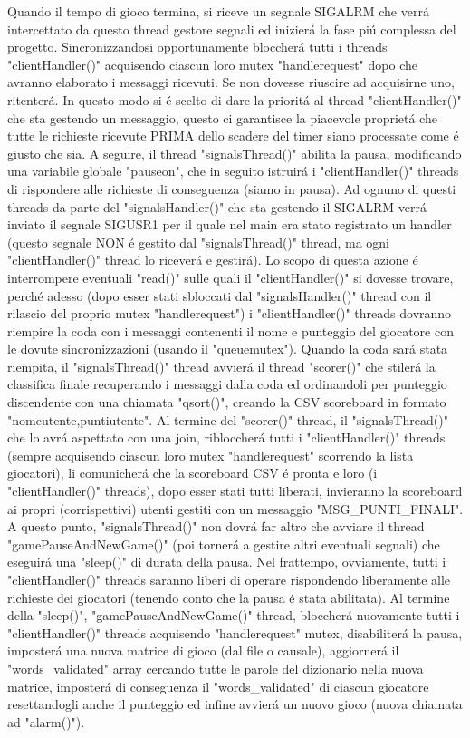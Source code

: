Quando il tempo di gioco termina, si riceve un segnale SIGALRM che verr\'a intercettato da questo thread gestore segnali ed inizier\'a la fase pi\'u complessa del progetto. Sincronizzandosi opportunamente bloccher\'a tutti i threads "clientHandler()" acquisendo ciascun loro mutex "handlerequest" dopo che avranno elaborato i messaggi ricevuti. Se non dovesse riuscire ad acquisirne uno, ritenter\'a. In questo modo si \'e scelto di dare la priorit\'a al thread "clientHandler()" che sta gestendo un messaggio, questo ci garantisce la piacevole propriet\'a che tutte le richieste ricevute PRIMA dello scadere del timer siano processate come \'e giusto che sia. A seguire, il thread "signalsThread()" abilita la pausa, modificando una variabile globale "pauseon", che in seguito istruir\'a i "clientHandler()" threads di rispondere alle richieste di conseguenza (siamo in pausa). Ad ognuno di questi threads da parte del "signalsHandler()" che sta gestendo il SIGALRM verr\'a inviato il segnale SIGUSR1 per il quale nel main era stato registrato un handler (questo segnale NON \'e gestito dal "signalsThread()" thread, ma ogni "clientHandler()" thread lo ricever\'a e gestir\'a). Lo scopo di questa azione \'e interrompere eventuali "read()" sulle quali il "clientHandler()" si dovesse trovare, perch\'e adesso (dopo esser stati sbloccati dal "signalsHandler()" thread con il rilascio del proprio mutex "handlerequest") i "clientHandler()" threads dovranno riempire la coda con i messaggi contenenti il nome e punteggio del giocatore con le dovute sincronizzazioni (usando il "queuemutex"). Quando la coda sar\'a stata riempita, il "signalsThread()" thread avvier\'a il thread "scorer()" che stiler\'a la classifica finale recuperando i messaggi dalla coda ed ordinandoli per punteggio discendente con una chiamata "qsort()", creando la CSV scoreboard in formato "nomeutente,puntiutente". Al termine del "scorer()" thread, il "signalsThread()" che lo avr\'a aspettato con una join, ribloccher\'a tutti i "clientHandler()" threads (sempre acquisendo ciascun loro mutex "handlerequest" scorrendo la lista giocatori), li comunicher\'a che la scoreboard CSV \'e pronta e loro (i "clientHandler()" threads), dopo esser stati tutti liberati, invieranno la scoreboard ai propri (corrispettivi) utenti gestiti con un messaggio "MSG\_PUNTI\_FINALI". A questo punto, "signalsThread()" non dovr\'a far altro che avviare il thread "gamePauseAndNewGame()" (poi torner\'a a gestire altri eventuali segnali) che eseguir\'a una "sleep()" di durata della pausa. Nel frattempo, ovviamente, tutti i "clientHandler()" threads saranno liberi di operare rispondendo liberamente alle richieste dei giocatori (tenendo conto che la pausa \'e stata abilitata). Al termine della "sleep()", "gamePauseAndNewGame()" thread, bloccher\'a nuovamente tutti i "clientHandler()" threads acquisendo "handlerequest" mutex, disabiliter\'a la pausa, imposter\'a una nuova matrice di gioco (dal file o causale), aggiorner\'a il "words\_validated" array cercando tutte le parole del dizionario nella nuova matrice, imposter\'a di conseguenza il "words\_validated" di ciascun giocatore resettandogli anche il punteggio ed infine avvier\'a un nuovo gioco (nuova chiamata ad "alarm()").
 
